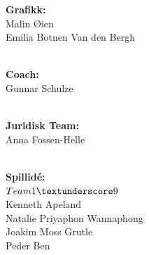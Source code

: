 \documentclass[paper=a4]{article}
\begin{document}
\begin{center}
\textbf{Grafikk:} \\
Malin Øien \\
Emilia Botnen Van den Bergh \\ \

\textbf{Coach:} \\
Gunnar Schulze \\ \ 

\textbf{Juridisk Team:} \\ 
Anna Fossen-Helle \\ \

\textbf{Spillidé:} \\
$Team 1\textunderscore9$ \\
Kenneth Apeland \\
Natalie Priyaphon Wannaphong \\
Joakim Moss Grutle \\
Peder Ben \\ \
\end{center}
\end{document}
